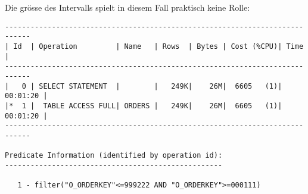 \documentclass[11pt,a4paper,parskip=half]{scrartcl}
\begin{document}
Die grösse des Intervalls spielt in diesem Fall praktisch keine Rolle:
\begin{lstlisting}
----------------------------------------------------------------------------                                                                                                                                                                                                                                 
| Id  | Operation         | Name   | Rows  | Bytes | Cost (%CPU)| Time     |                                                                                                                                                                                                                                 
----------------------------------------------------------------------------                                                                                                                                                                                                                                 
|   0 | SELECT STATEMENT  |        |   249K|    26M|  6605   (1)| 00:01:20 |                                                                                                                                                                                                                                 
|*  1 |  TABLE ACCESS FULL| ORDERS |   249K|    26M|  6605   (1)| 00:01:20 |                                                                                                                                                                                                                                 
----------------------------------------------------------------------------                                                                                                                                                                                                                                 
                                                                                                                                                                                                                                                                                                             
Predicate Information (identified by operation id):                                                                                                                                                                                                                                                          
---------------------------------------------------                                                                                                                                                                                                                                                          
                                                                                                                                                                                                                                                                                                             
   1 - filter("O_ORDERKEY"<=999222 AND "O_ORDERKEY">=000111)  
\end{lstlisting}
\end{document}
